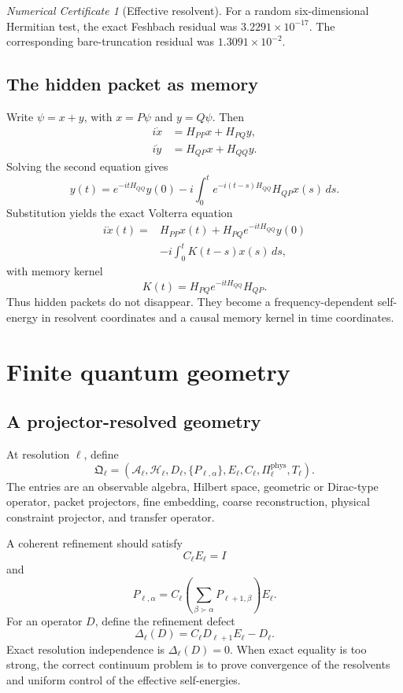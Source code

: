 \documentclass[11pt]{article}
\theoremstyle{definition}
\theoremstyle{remark}
\newtheorem{certificate}[theorem]{Numerical Certificate}
\newcommand{\cA}{\mathcal A}
\newcommand{\cH}{\mathcal H}
\begin{document}
\begin{certificate}[Effective resolvent]
For a random six-dimensional Hermitian test, the exact Feshbach residual was $3.2291\times10^{-17}$. The corresponding bare-truncation residual was $1.3091\times10^{-2}$.
\end{certificate}

\subsection{The hidden packet as memory}

Write $\psi=x+y$, with $x=P\psi$ and $y=Q\psi$. Then
\[
\begin{aligned}
i\dot x&=H_{PP}x+H_{PQ}y,\\
i\dot y&=H_{QP}x+H_{QQ}y.
\end{aligned}
\]
Solving the second equation gives
\[
y(t)
=e^{-itH_{QQ}}y(0)
-i\int_0^t e^{-i(t-s)H_{QQ}}H_{QP}x(s)\,ds.
\]
Substitution yields the exact Volterra equation
\[
\boxed{
\begin{aligned}
i\dot x(t)
={}&H_{PP}x(t)
+H_{PQ}e^{-itH_{QQ}}y(0)\\
&-i\int_0^t
K(t-s)x(s)\,ds,
\end{aligned}
}
\]
with memory kernel
\[
\boxed{
K(t)=H_{PQ}e^{-itH_{QQ}}H_{QP}.
}
\]
Thus hidden packets do not disappear. They become a frequency-dependent self-energy in resolvent coordinates and a causal memory kernel in time coordinates.

\section{Finite quantum geometry}

\subsection{A projector-resolved geometry}

At resolution $\ell$, define
\[
\boxed{
\mathfrak Q_\ell
=
\left(
\cA_\ell,
\cH_\ell,
D_\ell,
\{P_{\ell,\alpha}\},
E_\ell,
C_\ell,
\Pi_\ell^{\mathrm{phys}},
T_\ell
\right).
}
\]
The entries are an observable algebra, Hilbert space, geometric or Dirac-type operator, packet projectors, fine embedding, coarse reconstruction, physical constraint projector, and transfer operator.

A coherent refinement should satisfy
\[
C_\ell E_\ell=I
\]
and
\[
\boxed{
P_{\ell,\alpha}
=
C_\ell
\left(
\sum_{\beta\succ\alpha}P_{\ell+1,\beta}
\right)
E_\ell.
}
\]
For an operator $D$, define the refinement defect
\[
\Delta_\ell(D)
=C_\ell D_{\ell+1}E_\ell-D_\ell.
\]
Exact resolution independence is $\Delta_\ell(D)=0$. When exact equality is too strong, the correct continuum problem is to prove convergence of the resolvents and uniform control of the effective self-energies.
\end{document}
